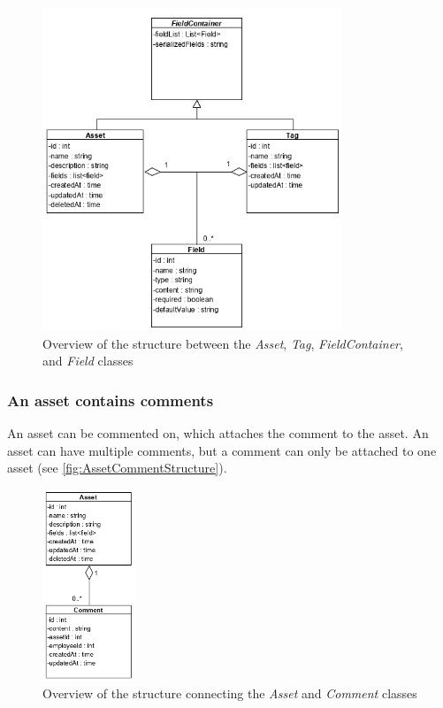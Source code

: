 \begin{figure}[H]
    \centering
    \includegraphics[width=0.8\textwidth]{figures/Structures/AssetTagFieldStructure.png}
    \caption{Overview of the structure between the \textit{Asset}, \textit{Tag}, \textit{FieldContainer}, and \textit{Field} classes}
    \label{fig:AssetTagFieldStructure}
\end{figure}

\subsubsection{An asset contains comments}
An asset can be commented on, which attaches the comment to the asset. An asset can have multiple comments, but a comment can only be attached to one asset (see \autoref{fig:AssetCommentStructure}).

\begin{figure}[H]
    \centering
    \includegraphics[width=0.25\textwidth]{figures/Structures/AssetCommentStructure.png}
    \caption{Overview of the structure connecting the \textit{Asset} and \textit{Comment} classes}
    \label{fig:AssetCommentStructure}
\end{figure}

